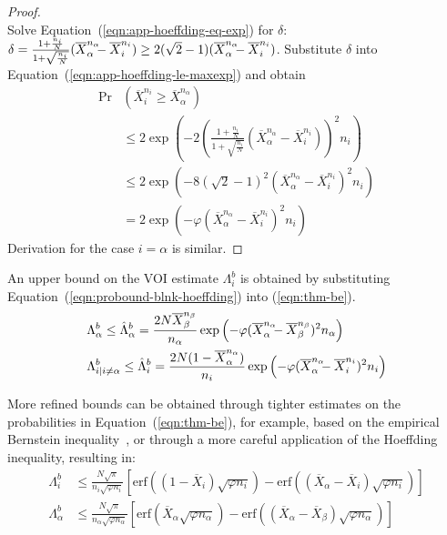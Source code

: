 \begin{proof}
\begin{equation}
	\end{equation}
	Solve Equation~(\ref{eqn:app-hoeffding-eq-exp}) for $\delta$: $\delta=\frac {1+\frac {n_i} N} {1+\sqrt {\frac {n_i} N}} (\overline X_\alpha^{n_\alpha}\hspace{-0.5em}
	- \overline X_i^{n_i}) \ge 2(\sqrt 2 - 1)(\overline X_\alpha^{n_\alpha}\hspace{-0.5em}-\overline X_i^{n_i})$. Substitute $\delta$ into 
	Equation~(\ref{eqn:app-hoeffding-le-maxexp}) and obtain
	\begin{align}
	\Pr&(\overline X_i^{n_i}\ge \overline X_\alpha^{n_\alpha}) \nonumber\\
	& \le 2\exp\left(-2\left( \frac {1+\frac {n_i} N} {1+\sqrt {\frac {n_i} N}}
	                          (\overline X_\alpha^{n_\alpha} - \overline X_i^{n_i})\right)^2 n_i\right)\nonumber \\
	& \le 2\exp(-8(\sqrt 2 - 1)^2(\overline X_\alpha^{n_\alpha} - \overline X_i^{n_i})^2n_i)\nonumber\\
	& = 2\exp(-\varphi(\overline X_\alpha^{n_\alpha} - \overline X_i^{n_i})^2n_i)
	\end{align}
	Derivation for the case $i=\alpha$ is similar.
\end{proof}	

\begin{crl}
An upper bound on the VOI estimate $\Lambda_i^b$ is obtained
by substituting Equation~(\ref{eqn:probound-blnk-hoeffding}) into (\ref{eqn:thm-be}).
\begin{align}
  \label{eqn:bound-blnk-hoeffding}
  \Lambda&_\alpha^b \le \hat\Lambda_\alpha^b=\frac {2N\overline X_\beta^{n_\beta}} {n_\alpha}\exp\left(- \varphi(\overline X_\alpha^{n_\alpha}\hspace{-0.5em} - \overline X_\beta^{n_\beta})^2 n_\alpha\right)\\
  \Lambda&_{i|i\ne\alpha}^b\le \hat\Lambda_i^b=  \frac {2N(1-\overline  X_\alpha^{n_\alpha})} {n_i}\exp\left(- \varphi(\overline X_\alpha^{n_\alpha}\hspace{-0.5em} - \overline X_i^{n_i})^2 n_i\right)\nonumber
\end{align}
\label{crl:bound-blnk-hoeffding}
\end{crl}
\vspace{-2em}

More refined bounds can be obtained through tighter estimates on the
probabilities in Equation~(\ref{eqn:thm-be}), for example, based on the empirical Bernstein
inequality~\cite{MaurerPontil.benrstein}, or through a more careful
application of the Hoeffding inequality, resulting in:
\begin{align}
\Lambda_i^b&\le\frac {N\sqrt \pi} {n_i \sqrt {\varphi n_i}}
  \left[\mathrm{erf}\left((1-\overline X_i)\sqrt {\varphi n_i}\right)
      -\mathrm{erf}\left((\overline X_\alpha - \overline X_i)\sqrt{\varphi n_i}\right)\right]\nonumber\\
\Lambda_\alpha^b&\le\frac {N\sqrt \pi} {n_\alpha \sqrt {\varphi n_\alpha}}
  \left[\mathrm{erf}\left(\overline X_\alpha\sqrt {\varphi n_\alpha}\right)
      -\mathrm{erf}\left((\overline X_\alpha - \overline X_\beta)\sqrt{\varphi n_\alpha}\right)\right]
\label{eqn:erf-blinkered}
\end{align}

